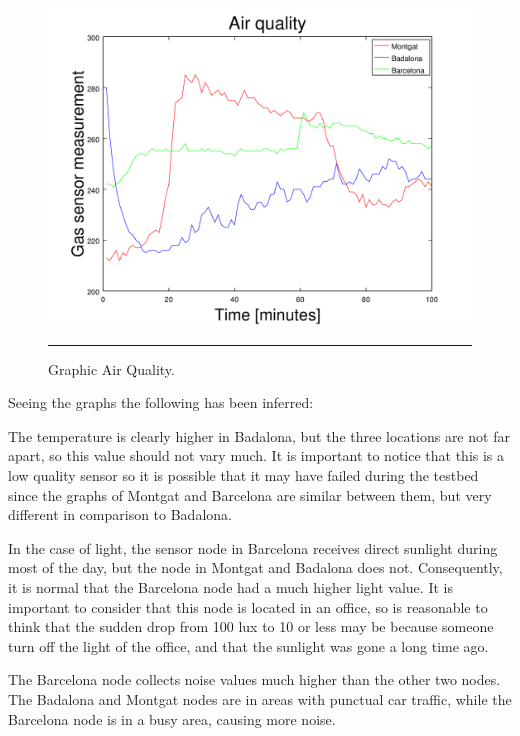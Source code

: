 \documentclass[12pt, a4paper,twoside]{tesi_upf}
\begin{document}
			\begin{figure}[H]
		    \centering
		        \includegraphics[scale=0.4]{./Figures/GraphicGas.png}
		        \rule{18em}{0.5pt}
		        \caption[Graphic Air Quality]{Graphic Air Quality.}
		        \label{fig:GraphicGas}
		  \end{figure}
			
			Seeing the graphs the following has been inferred:
      
      The temperature is clearly higher in Badalona, but the three locations are not far apart, so this value should not vary much. It is important to notice that this is a low quality sensor so it is possible that it may have failed during the testbed since the graphs of Montgat and Barcelona are similar between them, but very different in comparison to Badalona.
      
      In the case of light, the sensor node in Barcelona receives direct sunlight during most of the day, but the node in Montgat and Badalona does not. Consequently, it is normal that the Barcelona node had a much higher light value. It is important to consider that this node is located in an office, so is reasonable to think that the sudden drop from 100 lux to 10 or less may be because someone turn off the light of the office, and that the sunlight was gone a long time ago.
      
      The Barcelona node collects noise values much higher than the other two nodes. The Badalona and Montgat nodes are in areas with punctual car traffic, while the Barcelona node is in a busy area, causing more noise.
      
\end{document}
